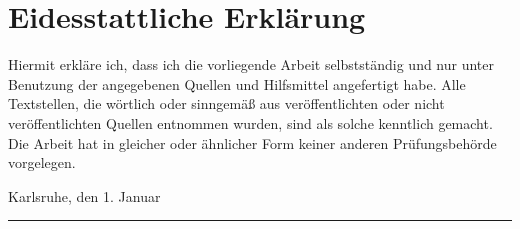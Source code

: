 {}

\chapter*{Eidesstattliche Erklärung}
\thispagestyle{empty}

Hiermit erkläre ich, dass ich die vorliegende Arbeit selbstständig und nur unter Benutzung der angegebenen Quellen und Hilfsmittel angefertigt habe. Alle Textstellen, die wörtlich oder sinngemäß aus veröffentlichten oder nicht veröffentlichten Quellen entnommen wurden, sind als solche kenntlich gemacht. Die Arbeit hat in gleicher oder ähnlicher Form keiner anderen Prüfungsbehörde vorgelegen.
\vspace{2\baselineskip}

\noindent Karlsruhe, den 1. Januar \the\year
\begin{flushright}
	\parbox{5cm}{
		\rule{5cm}{.5pt}
		\centering \raisebox{1.5mm}{Vorname Nachname}
	}
\end{flushright}
